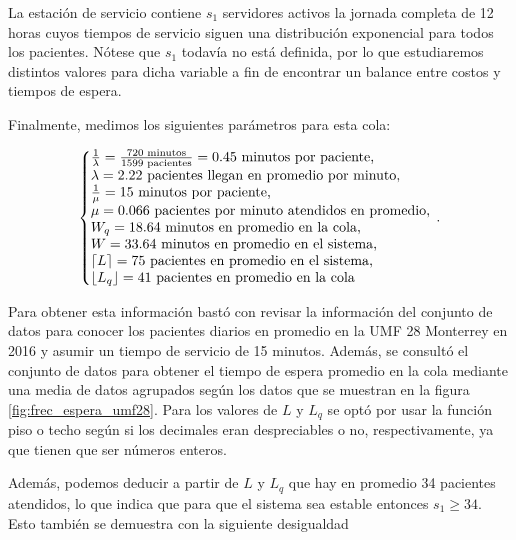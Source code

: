 \documentclass[10pt]{article}
\begin{document}
    La estación de servicio contiene $s_{1}$ servidores activos la jornada completa de 12 horas cuyos tiempos de servicio siguen una distribución exponencial para todos los pacientes. Nótese que $s_{1}$ todavía no está definida, por lo que estudiaremos distintos valores para dicha variable a fin de encontrar un balance entre costos y tiempos de espera.
    
    Finalmente, medimos los siguientes parámetros para esta cola:
    
    \begin{equation*}
    	\left\{
    		\begin{array}{@{}l@{}}
	    		\frac{1}{\lambda} = \frac{720 \text{ minutos}}{1599 \text{ pacientes}} = 0.45 \text{ minutos por paciente,} \\
	    		\lambda = 2.22 \text{ pacientes llegan en promedio por minuto,} \\
	    		\frac{1}{\mu} = 15 \text{ minutos por paciente,} \\
	    		\mu = 0.066 \text{ pacientes por minuto atendidos en promedio,} \\
	    		W_{q} = 18.64 \text{ minutos en promedio en la cola,} \\
	    		W = 33.64 \text{ minutos en promedio en el sistema,} \\
	    		\left\lceil L \right\rceil = 75 \text{ pacientes en promedio en el sistema,} \\
	    		\left\lfloor L_{q} \right\rfloor = 41 \text{ pacientes en promedio en la cola}
    		\end{array}
   		\right.\,.
    \end{equation*}
    
    Para obtener esta información bastó con revisar la información del conjunto de datos \cite{ensat2017} para conocer los pacientes diarios en promedio en la UMF 28 Monterrey en 2016 y asumir un tiempo de servicio de 15 minutos. Además, se consultó el conjunto de datos \cite{ensat2017} para obtener el tiempo de espera promedio en la cola mediante una media de datos agrupados según los datos que se muestran en la figura \ref{fig:frec_espera_umf28}. Para los valores de $L$ y $L_{q}$ se optó por usar la función piso o techo según si los decimales eran despreciables o no, respectivamente, ya que tienen que ser números enteros.
    
    Además, podemos deducir a partir de $L$ y $L_{q}$ que hay en promedio 34 pacientes atendidos, lo que indica que para que el sistema sea estable entonces $s_{1} \geq 34$. Esto también se demuestra con la siguiente desigualdad
    
\end{document}
